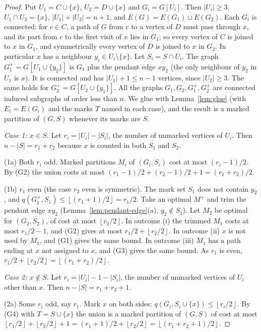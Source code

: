 \documentclass[11pt]{amsart}
\theoremstyle{definition}
\theoremstyle{remark}
\renewcommand{\_}{\oldunderscore\allowbreak}
\newcommand{\fl}[1]{\left\lfloor #1\right\rfloor}
\begin{document}
\begin{proof}
Put $U_1=C\cup\{x\}$, $U_2=D\cup\{x\}$ and $G_i=G[U_i]$. Then $|U_i|\ge3$, $U_1\cap U_2=\{x\}$,
$|U_1|+|U_2|=n+1$, and $E(G)=E(G_1)\sqcup E(G_2)$. Each $G_i$ is connected: for $c\in C$, a path of $G$
from $c$ to a vertex of $D$ must pass through $x$, and its part from $c$ to the first visit of $x$ lies
in $G_1$; so every vertex of $C$ is joined to $x$ in $G_1$, and symmetrically every vertex of $D$ is
joined to $x$ in $G_2$. In
particular $x$ has a neighbour $y_i\in U_i\setminus\{x\}$. Let $S_i=S\cap U_i$. The graph
$G_1^+=G[U_1\cup\{y_2\}]$ is $G_1$ plus the pendant edge $xy_2$ (the only neighbour of $y_2$ in
$U_1$ is $x$). It is connected and has $|U_1|+1\le n-1$ vertices, since $|U_2|\ge3$. The same holds
for $G_2^+=G[U_2\cup\{y_1\}]$. All the graphs $G_1,G_2,G_1^+,G_2^+$ are connected induced subgraphs of
order less than $n$. We glue with Lemma~\ref{lem:glue} (with $E_i=E(G_i)$ and the marks $T$ named in
each case), and the result is a marked partition of $(G,S)$ whenever its marks are $S$.

\emph{Case 1: $x\in S$.} Let $r_i=|U_i|-|S_i|$, the number of unmarked vertices of $U_i$. Then
$n-|S|=r_1+r_2$ because $x$ is counted in both $S_1$ and $S_2$.

(1a) Both $r_i$ odd. Marked partitions $M_i$ of $(G_i,S_i)$ cost at most $(r_i-1)/2$. By (G2) the
union costs at most $(r_1-1)/2+(r_2-1)/2+1=(r_1+r_2)/2$.

(1b) $r_1$ even (the case $r_2$ even is symmetric). The mark set $S_1$ does not contain $y_2$, and
$q(G_1^+,S_1)\le\fl{(r_1+1)/2}=r_1/2$. Take an optimal $M^+$ and trim the pendant edge $xy_2$
(Lemma~\ref{lem:pendant-edge}(a), $y_2\notin S_1$). Let $M_2$ be optimal for $(G_2,S_2)$, of cost at
most $\fl{r_2/2}$. In outcome (i) the trimmed $M_1$ costs at most $r_1/2-1$, and (G2) gives at most
$r_1/2+\fl{r_2/2}$. In outcome (ii) $x$ is not used by $M_1$, and (G1) gives the same bound. In
outcome (iii) $M_1$ has a path ending at $x$ not assigned to $x$, and (G3) gives the same bound. As
$r_1$ is even, $r_1/2+\fl{r_2/2}=\fl{(r_1+r_2)/2}$.

\emph{Case 2: $x\notin S$.} Let $r_i=|U_i|-1-|S_i|$, the number of unmarked vertices of $U_i$ other
than $x$. Then $n-|S|=r_1+r_2+1$.

(2a) Some $r_i$ odd, say $r_1$. Mark $x$ on both sides: $q(G_i,S_i\cup\{x\})\le\fl{r_i/2}$. By (G4)
with $T=S\cup\{x\}$ the union is a marked partition of $(G,S)$ of cost at most
$\fl{r_1/2}+\fl{r_2/2}+1=(r_1+1)/2+\fl{r_2/2}=\fl{(r_1+r_2+1)/2}$.


\end{proof}
\end{document}
